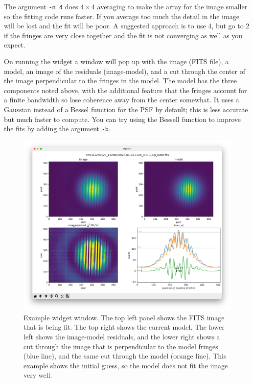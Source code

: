 \documentclass[11pt]{article}
\begin{document}
The argument \texttt{-n 4} does $4 \times 4$ averaging to make the array for the image smaller so the fitting code runs faster. If you average too much the detail in the image will be lost and the fit will be poor. A suggested approach is to use 4, but go to 2 if the fringes are very close together and the fit is not converging as well as you expect.

On running the widget a window will pop up with the image (FITS file), a model, an image of the residuals (image-model), and a cut through the center of the image perpendicular to the fringes in the model. The model has the three components noted above, with the additional feature that the fringes account for a finite bandwidth so lose coherence away from the center somewhat. It uses a Gaussian instead of a Bessel function for the PSF by default; this is less accurate but much faster to compute. You can try using the Bessell function to improve the fits by adding the argument \texttt{-b}.
\begin{figure}[h!]
    \centering
    \includegraphics[width=1\textwidth]{widget.png}
    \caption{Example widget window. The top left panel shows the FITS image that is being fit. The top right shows the current model. The lower left shows the image-model residuals, and the lower right shows a cut through the image that is perpendicular to the model fringes (blue line), and the same cut through the model (orange line). This example shows the initial guess, so the model does not fit the image very well.}
    \label{fig:widget}
\end{figure}
\end{document}
